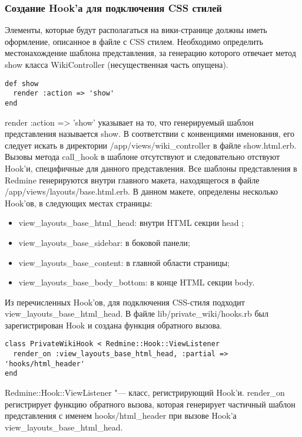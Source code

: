 \subsubsection{Создание Hook'а для подключения CSS стилей}
Элементы, которые будут располагаться на вики-странице должны иметь оформление,
описанное в файле с CSS стилем. Необходимо определить местонахождение шаблона
представления, за генерацию которого отвечает метод show класса
WikiController (несущественная часть опущена).
\small{\begin{lstlisting}
def show
  render :action => 'show'
end
\end{lstlisting}}
render :action => 'show' указывает на то, что генерируемый шаблон представления
называется show. В соответствии с конвенциями именования, его следует искать в
директории /app/views/wiki\_controller в файле show.html.erb.
Вызовы метода call\_hook в шаблоне отсутствуют и следовательно отствуют Hook'и,
специфичные для данного представления. Все шаблоны представления в Redmine
генерируются внутри главного макета, находящегося в файле
/app/views/layouts/base.html.erb. В данном макете, определены несколько
Hook'ов, в следующих местах страницы:
\begin{itemize}
  \item view\_layouts\_base\_html\_head: внутри HTML секции head ;
  \item view\_layouts\_base\_sidebar: в боковой панели;
  \item view\_layouts\_base\_content: в главной области страницы; 
  \item view\_layouts\_base\_body\_bottom: в конце HTML секции body.
\end{itemize}
Из перечисленных Hook'ов, для подключения CSS-стиля подходит
view\_layouts\_base\_html\_head. В файле lib/private\_wiki/hooks.rb был
зарегистрирован Hook и создана функция обратного вызова.
\small{\begin{lstlisting}
class PrivateWikiHook < Redmine::Hook::ViewListener
  render_on :view_layouts_base_html_head, :partial => 'hooks/html_header'
end
\end{lstlisting}}
Redmine::Hook::ViewListener "--- класс, регистрирующий Hook'и. render\_on
регистрирует функцию обратного вызова, которая генерирует частичный шаблон
представления с именем hooks/html\_header при вызове Hook'а
view\_layouts\_base\_html\_head.

